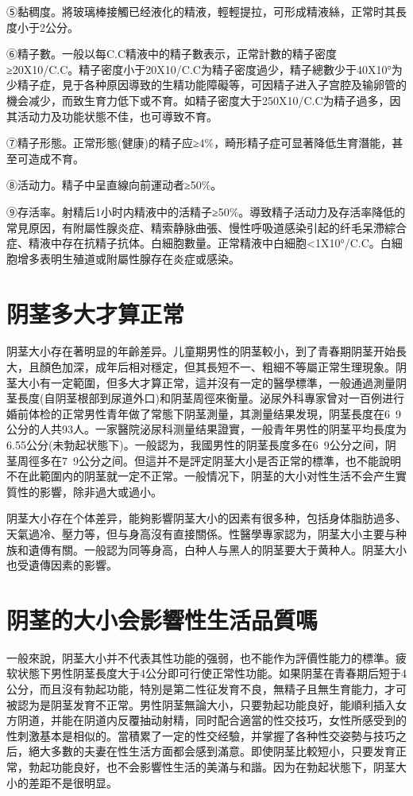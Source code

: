 \documentclass[12pt,UTF8]{ctexbook}
\begin{document}
⑤黏稠度。將玻璃棒接觸已经液化的精液，輕輕提拉，可形成精液絲，正常时其長度小于2公分。

⑥精子數。一般以每C.C精液中的精子數表示，正常計數的精子密度≥20X10/C.C。精子密度小于20X10/C.C为精子密度過少，精子總數少于40X10°为少精子症，見于各种原因導致的生精功能障礙等，可因精子进入子宫腔及输卵管的機会减少，而致生育力低下或不育。如精子密度大于250X10/C.C为精子過多，因其活动力及功能状態不佳，也可導致不育。

⑦精子形態。正常形態(健康)的精子应≥4\%，畸形精子症可显著降低生育潛能，甚至可造成不育。

⑧活动力。精子中呈直線向前運动者≥50\%。

⑨存活率。射精后1小时内精液中的活精子≥50\%。導致精子活动力及存活率降低的常見原因，有附屬性腺炎症、精索静脉曲張、慢性呼吸道感染引起的纤毛呆滯綜合症、精液中存在抗精子抗体。白細胞數量。正常精液中白細胞<1X10°/C.C。白細胞增多表明生殖道或附屬性腺存在炎症或感染。

\section{阴茎多大才算正常}

阴茎大小存在著明显的年齡差异。儿童期男性的阴茎較小，到了青春期阴茎开始長大，且顏色加深，成年后相对穩定，但其長短不一、粗細不等屬正常生理現象。阴茎大小有一定範圍，但多大才算正常，這并沒有一定的醫學標準，一般通過測量阴茎長度(自阴茎根部到尿道外口)和阴茎周徑來衡量。泌尿外科專家曾对一百例进行婚前体检的正常男性青年做了常態下阴茎測量，其測量结果发現，阴茎長度在6~9公分的人共93人。一家醫院泌尿科测量结果證實，一般青年男性的阴茎平均長度为6.55公分(未勃起状態下)。一般認为，我國男性的阴茎長度多在6~9公分之间，阴茎周徑多在7~9公分之间。但這并不是評定阴茎大小是否正常的標準，也不能說明不在此範圍内的阴茎就一定不正常。一般情况下，阴茎的大小对性生活不会产生實質性的影響，除非過大或過小。

阴茎大小存在个体差异，能夠影響阴茎大小的因素有很多种，包括身体脂肪過多、天氣過冷、壓力等，但与身高沒有直接關係。性醫學專家認为，阴茎大小主要与种族和遺傳有關。一般認为同等身高，白种人与黑人的阴茎要大于黄种人。阴茎大小也受遺傳因素的影響。

\section{阴茎的大小会影響性生活品質嗎}

一般來說，阴茎大小并不代表其性功能的强弱，也不能作为評價性能力的標準。疲软状態下男性阴茎長度大于4公分即可行使正常性功能。如果阴茎在青春期后短于4公分，而且沒有勃起功能，特別是第二性征发育不良，無精子且無生育能力，才可被認为是阴茎发育不正常。男性阴茎無論大小，只要勃起功能良好，能順利插入女方阴道，并能在阴道内反覆抽动射精，同时配合適當的性交技巧，女性所感受到的性刺激基本是相似的。當積累了一定的性交经驗，并掌握了各种性交姿勢与技巧之后，絕大多數的夫妻在性生活方面都会感到滿意。即使阴茎比較短小，只要发育正常，勃起功能良好，也不会影響性生活的美滿与和諧。因为在勃起状態下，阴茎大小的差距不是很明显。
\end{document}
